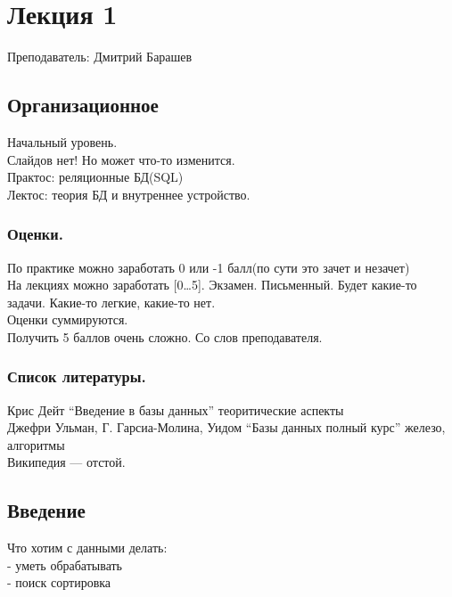 \section*{Лекция 1
}
\noindent Преподаватель: Дмитрий Барашев \\

\subsection*{Организационное
}
\noindent Начальный уровень. \\
\noindent Слайдов нет! Но может что-то изменится. \\

\noindent Практос: реляционные БД(SQL) \\
\noindent Лектос: теория БД и внутреннее устройство. \\

\subsubsection*{Оценки.
}
\noindent По практике можно заработать 0 или -1 балл(по сути это зачет и незачет) \\
\noindent На лекциях можно заработать [0…5]. Экзамен. Письменный. Будет какие-то задачи. Какие-то легкие, какие-то нет. \\
\noindent Оценки суммируются. \\
\noindent Получить 5 баллов очень сложно. Со слов преподавателя. \\

\subsubsection*{Список литературы.
}
\noindent Крис Дейт “Введение в базы данных” теоритические аспекты \\
\noindent Джефри Ульман, Г. Гарсиа-Молина, Уидом “Базы данных полный курс” железо, алгоритмы \\
\noindent Википедия — отстой. \\

\subsection*{Введение
}
\noindent Что хотим с данными делать: \\
\noindent - уметь обрабатывать \\
\noindent - поиск сортировка \\

